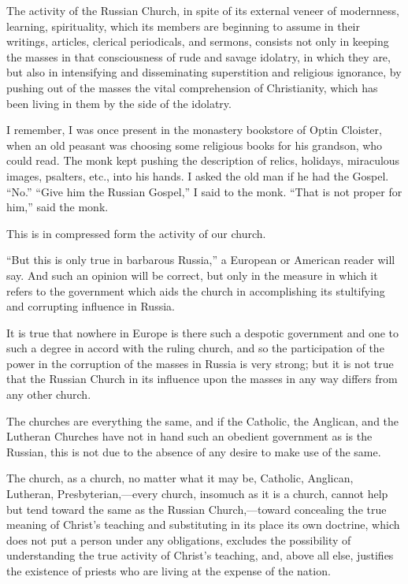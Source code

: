 \documentclass{book}
\begin{document}
The activity of the Russian Church, in spite of its external veneer of modernness, learning, spirituality, which its members are beginning to assume in their writings, articles, clerical periodicals, and sermons, consists not only in keeping the masses in that consciousness of rude and savage idolatry, in which they are, but also in intensifying and disseminating superstition and religious ignorance, by pushing out of the masses the vital comprehension of Christianity, which has been living in them by the side of the idolatry.

I remember, I was once present in the monastery bookstore of Optin Cloister, when an old peasant was choosing some religious books for his grandson, who could read. The monk kept pushing the description of relics, holidays, miraculous images, psalters, etc., into his hands. I asked the old man if he had the Gospel. “No.” “Give him the Russian Gospel,” I said to the monk. “That is not proper for him,” said the monk.

This is in compressed form the activity of our church.

“But this is only true in barbarous Russia,” a European or American reader will say. And such an opinion will be correct, but only in the measure in which it refers to the government which aids the church in accomplishing its stultifying and corrupting influence in Russia.

It is true that nowhere in Europe is there such a despotic government and one to such a degree in accord with the ruling church, and so the participation of the power in the corruption of the masses in Russia is very strong; but it is not true that the Russian Church in its influence upon the masses in any way differs from any other church.

The churches are everything the same, and if the Catholic, the Anglican, and the Lutheran Churches have not in hand such an obedient government as is the Russian, this is not due to the absence of any desire to make use of the same.

The church, as a church, no matter what it may be, Catholic, Anglican, Lutheran, Presbyterian,—every church, insomuch as it is a church, cannot help but tend toward the same as the Russian Church,—toward concealing the true meaning of Christ’s teaching and substituting in its place its own doctrine, which does not put a person under any obligations, excludes the possibility of understanding the true activity of Christ’s teaching, and, above all else, justifies the existence of priests who are living at the expense of the nation.
\end{document}
